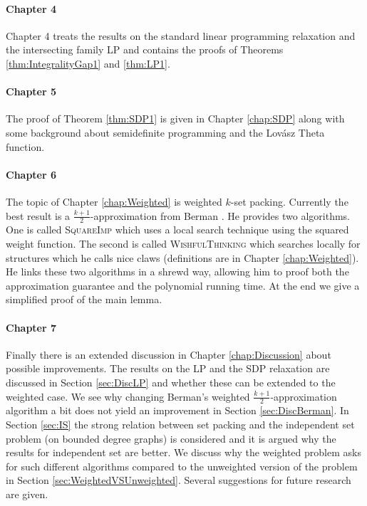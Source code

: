 \paragraph{Chapter 4} Chapter 4 treats the results on the standard linear programming relaxation and the intersecting family LP and contains the proofs of Theorems \ref{thm:IntegralityGap1} and \ref{thm:LP1}.

\paragraph{Chapter 5} The proof of Theorem \ref{thm:SDP1} is given in Chapter \ref{chap:SDP} along with some background about semidefinite programming and the Lov\'{a}sz Theta function.

\paragraph{Chapter 6} The topic of Chapter \ref{chap:Weighted} is weighted $k$-set packing. Currently the best result is a $\frac{k+1}{2}$-approximation from Berman \cite{Berman}. He provides two algorithms. One is called \textsc{SquareImp} which uses a local search technique using the squared weight function. The second is called \textsc{WishfulThinking} which searches locally for structures which he calls nice claws (definitions are in Chapter \ref{chap:Weighted}). He links these two algorithms in a shrewd way, allowing him to proof both the approximation guarantee and the polynomial running time. At the end we give a simplified proof of the main lemma.

\paragraph{Chapter 7} Finally there is an extended discussion in Chapter \ref{chap:Discussion} about possible improvements. The results on the LP and the SDP relaxation are discussed in Section \ref{sec:DiscLP} and whether these can be extended to the weighted case. We see why changing Berman's \cite{Berman} weighted $\frac{k+1}{2}$-approximation algorithm a bit does not yield an improvement in Section \ref{sec:DiscBerman}. In Section \ref{sec:IS} the strong relation between set packing and the independent set problem (on bounded degree graphs) is considered and it is argued why the results for independent set are better. We discuss why the weighted problem asks for such different algorithms compared to the unweighted version of the problem in Section \ref{sec:WeightedVSUnweighted}. Several suggestions for future research are given. %

